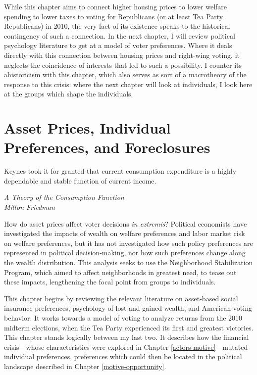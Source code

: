 \documentclass[12pt,oneside]{psthesis}
\begin{document}
While this chapter aims to connect higher housing prices to lower welfare spending to lower taxes to voting for Republicans (or at least Tea Party Republicans) in 2010, the very fact of its existence speaks to the historical contingency of such a connection.
In the next chapter, I will review political psychology literature to get at a model of voter preferences.
Where it deals directly with this connection between housing prices and right-wing voting, it neglects the coincidence of interests that led to such a possibility.
I counter its ahistoricism with this chapter, which also serves as sort of a macrotheory of the response to this crisis: where the next chapter will look at individuals, I look here at the groups which shape the individuals.

\hypertarget{methods}{%
\chapter{Asset Prices, Individual Preferences, and Foreclosures}\label{methods}}

\epigraph{Keynes took it for granted that current consumption expenditure is a highly dependable and stable function of current income.}{\textit{A Theory of the Consumption Function \\ Milton Friedman}}

How do asset prices affect voter decisions \emph{in extremis}?
Political economists have investigated the impacts of wealth on welfare preferences and labor market risk on welfare preferences, but it has not investigated how such policy preferences are represented in political decision-making, nor how such preferences change along the wealth distribution.
This analysis seeks to use the Neighborhood Stabilization Program, which aimed to affect neighborhoods in greatest need, to tease out these impacts, lengthening the focal point from groups to individuals.

This chapter begins by reviewing the relevant literature on asset-based social insurance preferences, psychology of lost and gained wealth, and American voting behavior.
It works towards a model of voting to analyze returns from the 2010 midterm elections, when the Tea Party experienced its first and greatest victories.
This chapter stands logically between my last two.
It describes how the financial crisis---whose characteristics were explored in Chapter \ref{actors-motive}---mutated individual preferences, preferences which could then be located in the political landscape described in Chapter \ref{motive-opportunity}.
\end{document}
